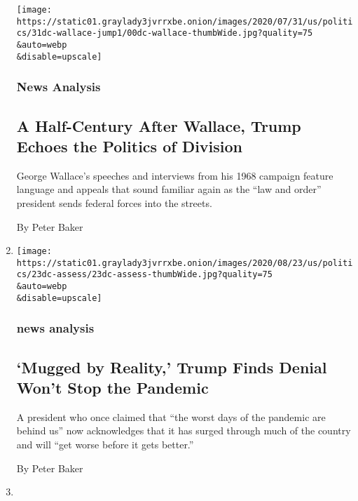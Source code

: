 \begin{enumerate}
  \texttt{[image: https://static01.graylady3jvrrxbe.onion/images/2020/07/31/us/politics/31dc-wallace-jump1/00dc-wallace-thumbWide.jpg?quality=75\\\&auto=webp\\\&disable=upscale]}

  \hypertarget{news-analysis-1}{%
  \subsubsection{News Analysis}\label{news-analysis-1}}

  \hypertarget{a-half-century-after-wallace-trump-echoes-the-politics-of-division}{%
  \subsection{A Half-Century After Wallace, Trump Echoes the Politics of
  Division}\label{a-half-century-after-wallace-trump-echoes-the-politics-of-division}}

  George Wallace's speeches and interviews from his 1968 campaign
  feature language and appeals that sound familiar again as the ``law
  and order'' president sends federal forces into the streets.

  By Peter Baker
\item
  \href{/2020/07/24/us/politics/coronavirus-trump-denial.html}{}

  \texttt{[image: https://static01.graylady3jvrrxbe.onion/images/2020/08/23/us/politics/23dc-assess/23dc-assess-thumbWide.jpg?quality=75\\\&auto=webp\\\&disable=upscale]}

  \hypertarget{news-analysis-2}{%
  \subsubsection{news analysis}\label{news-analysis-2}}

  \hypertarget{mugged-by-reality-trump-finds-denial-wont-stop-the-pandemic}{%
  \subsection{`Mugged by Reality,' Trump Finds Denial Won't Stop the
  Pandemic}\label{mugged-by-reality-trump-finds-denial-wont-stop-the-pandemic}}

  A president who once claimed that ``the worst days of the pandemic are
  behind us'' now acknowledges that it has surged through much of the
  country and will ``get worse before it gets better.''

  By Peter Baker
\item
  \href{/2020/07/23/us/politics/person-woman-man-camera-tv-trump.html}{}


\end{enumerate}
